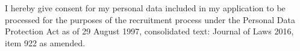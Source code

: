 \documentclass[11pt, a4paper]{awesome-cv}
\begin{document}
\makecvheader[C]

\makecvfooter
  {}
  {I hereby give consent for my personal data included in my application to be processed for the purposes of the recruitment process under the Personal Data Protection Act as of 29 August 1997, consolidated text: Journal of Laws 2016, item 922 as amended.}
  {}












\end{document}

